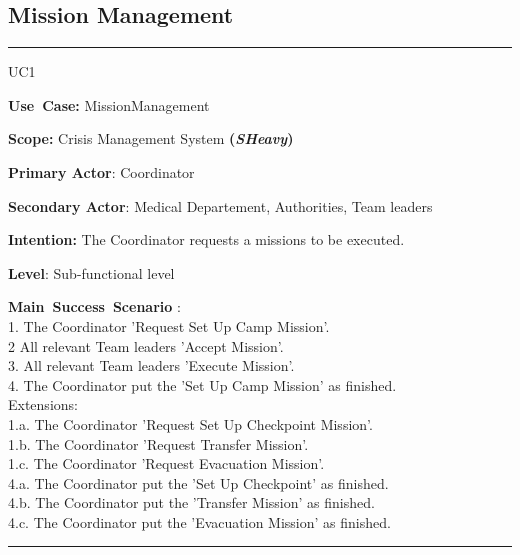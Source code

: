 \subsection{Mission Management}
\vspace{0.5cm}
\hrule
\vspace{0.5cm}
\begin{lyxlist}{UC1}
\small{
\item [\textbf{Use~Case:}] MissionManagement
\item [\textbf{Scope:}] Crisis Management System \textbf{(\emph{SHeavy})}
\item [\textbf{Primary Actor}:] Coordinator
\item [\textbf{Secondary Actor}:] Medical Departement, Authorities, Team leaders
\item [\textbf{Intention:}]The Coordinator requests a missions to be executed.
\item [\textbf{Level}:]Sub-functional level
\item [\textbf{Main~Success~Scenario}]:\\
1. The Coordinator 'Request Set Up Camp Mission'.\\
2  All relevant Team leaders 'Accept Mission'.\\
3. All relevant Team leaders 'Execute Mission'.\\
4. The Coordinator put the 'Set Up Camp Mission' as finished.\\
Extensions:\\
	1.a. The Coordinator 'Request Set Up Checkpoint Mission'.\\
	1.b. The Coordinator 'Request Transfer Mission'.\\
	1.c. The Coordinator 'Request Evacuation Mission'.\\
	4.a. The Coordinator put the 'Set Up Checkpoint' as finished.\\
	4.b. The Coordinator put the 'Transfer Mission' as finished.\\
	4.c. The Coordinator put the 'Evacuation Mission' as finished.\\	
}
\end{lyxlist}
\hrule 
\vspace{0.5cm} 

